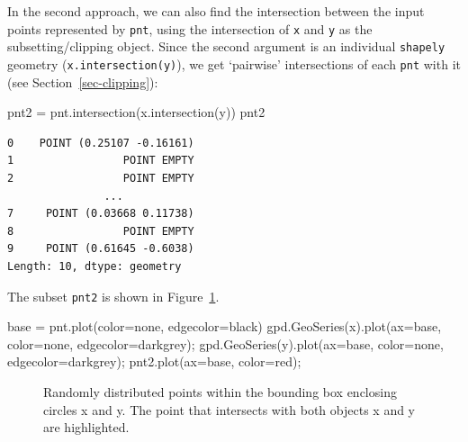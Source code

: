 \documentclass[
  letterpaper,
]{krantz}
\newenvironment{Shaded}{\begin{snugshade}}{\end{snugshade}}
\newcommand{\NormalTok}[1]{\textcolor[rgb]{0.00,0.23,0.31}{#1}}
\newcommand{\OperatorTok}[1]{\textcolor[rgb]{0.37,0.37,0.37}{#1}}
\newcommand{\StringTok}[1]{\textcolor[rgb]{0.13,0.47,0.30}{#1}}
\begin{document}
In the second approach, we can also find the intersection between the
input points represented by \texttt{pnt}, using the intersection of
\texttt{x} and \texttt{y} as the subsetting/clipping object. Since the
second argument is an individual \texttt{shapely} geometry
(\texttt{x.intersection(y)}), we get `pairwise' intersections of each
\texttt{pnt} with it (see Section~\ref{sec-clipping}):

\begin{Shaded}
\begin{Highlighting}[]
\NormalTok{pnt2 }\OperatorTok{=}\NormalTok{ pnt.intersection(x.intersection(y))}
\NormalTok{pnt2}
\end{Highlighting}
\end{Shaded}

\begin{verbatim}
0    POINT (0.25107 -0.16161)
1                 POINT EMPTY
2                 POINT EMPTY
               ...           
7     POINT (0.03668 0.11738)
8                 POINT EMPTY
9     POINT (0.61645 -0.6038)
Length: 10, dtype: geometry
\end{verbatim}

The subset \texttt{pnt2} is shown in
Figure~\ref{fig-intersection-points}.

\begin{Shaded}
\begin{Highlighting}[]
\NormalTok{base }\OperatorTok{=}\NormalTok{ pnt.plot(color}\OperatorTok{=}\StringTok{\textquotesingle{}none\textquotesingle{}}\NormalTok{, edgecolor}\OperatorTok{=}\StringTok{\textquotesingle{}black\textquotesingle{}}\NormalTok{)}
\NormalTok{gpd.GeoSeries(x).plot(ax}\OperatorTok{=}\NormalTok{base, color}\OperatorTok{=}\StringTok{\textquotesingle{}none\textquotesingle{}}\NormalTok{, edgecolor}\OperatorTok{=}\StringTok{\textquotesingle{}darkgrey\textquotesingle{}}\NormalTok{)}\OperatorTok{;}
\NormalTok{gpd.GeoSeries(y).plot(ax}\OperatorTok{=}\NormalTok{base, color}\OperatorTok{=}\StringTok{\textquotesingle{}none\textquotesingle{}}\NormalTok{, edgecolor}\OperatorTok{=}\StringTok{\textquotesingle{}darkgrey\textquotesingle{}}\NormalTok{)}\OperatorTok{;}
\NormalTok{pnt2.plot(ax}\OperatorTok{=}\NormalTok{base, color}\OperatorTok{=}\StringTok{\textquotesingle{}red\textquotesingle{}}\NormalTok{)}\OperatorTok{;}
\end{Highlighting}
\end{Shaded}

\begin{figure}[H]


\caption{\label{fig-intersection-points}Randomly distributed points
within the bounding box enclosing circles x and y. The point that
intersects with both objects x and y are highlighted.}

\end{figure}%
\end{document}
